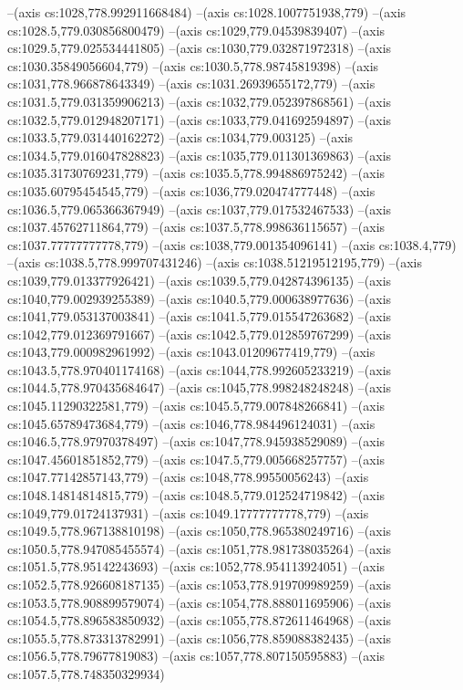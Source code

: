 --(axis cs:1028,778.992911668484)
--(axis cs:1028.1007751938,779)
--(axis cs:1028.5,779.030856800479)
--(axis cs:1029,779.04539839407)
--(axis cs:1029.5,779.025534441805)
--(axis cs:1030,779.032871972318)
--(axis cs:1030.35849056604,779)
--(axis cs:1030.5,778.98745819398)
--(axis cs:1031,778.966878643349)
--(axis cs:1031.26939655172,779)
--(axis cs:1031.5,779.031359906213)
--(axis cs:1032,779.052397868561)
--(axis cs:1032.5,779.012948207171)
--(axis cs:1033,779.041692594897)
--(axis cs:1033.5,779.031440162272)
--(axis cs:1034,779.003125)
--(axis cs:1034.5,779.016047828823)
--(axis cs:1035,779.011301369863)
--(axis cs:1035.31730769231,779)
--(axis cs:1035.5,778.994886975242)
--(axis cs:1035.60795454545,779)
--(axis cs:1036,779.020474777448)
--(axis cs:1036.5,779.065366367949)
--(axis cs:1037,779.017532467533)
--(axis cs:1037.45762711864,779)
--(axis cs:1037.5,778.998636115657)
--(axis cs:1037.77777777778,779)
--(axis cs:1038,779.001354096141)
--(axis cs:1038.4,779)
--(axis cs:1038.5,778.999707431246)
--(axis cs:1038.51219512195,779)
--(axis cs:1039,779.013377926421)
--(axis cs:1039.5,779.042874396135)
--(axis cs:1040,779.002939255389)
--(axis cs:1040.5,779.000638977636)
--(axis cs:1041,779.053137003841)
--(axis cs:1041.5,779.015547263682)
--(axis cs:1042,779.012369791667)
--(axis cs:1042.5,779.012859767299)
--(axis cs:1043,779.000982961992)
--(axis cs:1043.01209677419,779)
--(axis cs:1043.5,778.970401174168)
--(axis cs:1044,778.992605233219)
--(axis cs:1044.5,778.970435684647)
--(axis cs:1045,778.998248248248)
--(axis cs:1045.11290322581,779)
--(axis cs:1045.5,779.007848266841)
--(axis cs:1045.65789473684,779)
--(axis cs:1046,778.984496124031)
--(axis cs:1046.5,778.97970378497)
--(axis cs:1047,778.945938529089)
--(axis cs:1047.45601851852,779)
--(axis cs:1047.5,779.005668257757)
--(axis cs:1047.77142857143,779)
--(axis cs:1048,778.99550056243)
--(axis cs:1048.14814814815,779)
--(axis cs:1048.5,779.012524719842)
--(axis cs:1049,779.01724137931)
--(axis cs:1049.17777777778,779)
--(axis cs:1049.5,778.967138810198)
--(axis cs:1050,778.965380249716)
--(axis cs:1050.5,778.947085455574)
--(axis cs:1051,778.981738035264)
--(axis cs:1051.5,778.95142243693)
--(axis cs:1052,778.954113924051)
--(axis cs:1052.5,778.926608187135)
--(axis cs:1053,778.919709989259)
--(axis cs:1053.5,778.908899579074)
--(axis cs:1054,778.888011695906)
--(axis cs:1054.5,778.896583850932)
--(axis cs:1055,778.872611464968)
--(axis cs:1055.5,778.873313782991)
--(axis cs:1056,778.859088382435)
--(axis cs:1056.5,778.79677819083)
--(axis cs:1057,778.807150595883)
--(axis cs:1057.5,778.748350329934)
